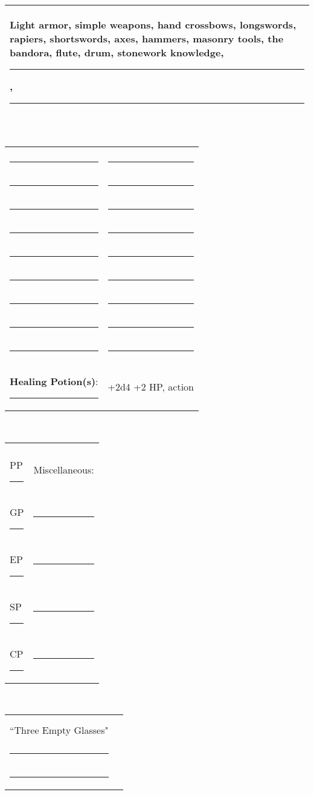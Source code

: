 \documentclass{article}
\begin{document}
\begin{multicols}{3}
\\
\noindent\begin{tabular}{|m{3.1in}|}
\hline
Light armor, simple weapons, hand crossbows, longswords, rapiers, shortswords, axes, hammers, masonry tools,
the bandora, flute, drum, stonework knowledge, \rule{1in}{.2pt}, \rule{1in}{.2pt}\\
\hline
\end{tabular}
\vspace{12pt}

\\
\noindent\begin{tabular}{|ll|}
\hline&\\
\rule{1.4in}{.2pt}&\rule{1.4in}{.2pt}\\
\rule{1.4in}{.2pt}&\rule{1.4in}{.2pt}\\
\rule{1.4in}{.2pt}&\rule{1.4in}{.2pt}\\
\rule{1.4in}{.2pt}&\rule{1.4in}{.2pt}\\
\rule{1.4in}{.2pt}&\rule{1.4in}{.2pt}\\
\rule{1.4in}{.2pt}&\rule{1.4in}{.2pt}\\
\rule{1.4in}{.2pt}&\rule{1.4in}{.2pt}\\
\rule{1.4in}{.2pt}&\rule{1.4in}{.2pt}\\
\rule{1.4in}{.2pt}&\rule{1.4in}{.2pt}\\
\textbf{Healing Potion(s)}: \rule{.2in}{.2pt}& +2d4 +2 HP, {\sc action}\\
\hline
\end{tabular}
\vspace{12pt}


\\
\noindent\begin{tabular}{|ll|}
\hline&\\
PP \rule{.5in}{.2pt} &Miscellaneous:\\
GP \rule{.5in}{.2pt} &\rule{2.2in}{.2pt}\\
EP \rule{.5in}{.2pt} &\rule{2.2in}{.2pt}\\
SP \rule{.5in}{.2pt} &\rule{2.2in}{.2pt}\\
CP \rule{.5in}{.2pt} &\rule{2.2in}{.2pt}\\
\hline
\end{tabular}
\vspace{12pt}

\\
\noindent\begin{tabular}{|ll|}
\hline&\\
``Three Empty Glasses"&\rule{1.5in}{.2pt}\\
\rule{1.45in}{.2pt}&\rule{1.5in}{.2pt}\\
\rule{1.45in}{.2pt}&\rule{1.5in}{.2pt}\\
\hline
\end{tabular}


\end{multicols}
\end{document}
